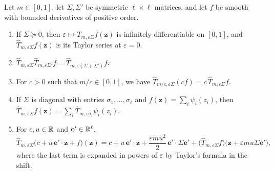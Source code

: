 \begin{lemma}\label{lem:cub-formal}
Let $m\in[0,1]$, let $\Sigma,\Sigma'$ be symmetric $\ell\times\ell$ matrices, and
let $f$ be smooth with bounded derivatives of positive order.
\begin{enumerate}[label=\textup{(\alph*)}]
\item If $\Sigma\succeq0$, then $\varepsilon\mapsto T_{m,\varepsilon\Sigma}f(\mathbf z)$
 is infinitely differentiable on $[0,1]$, and $\widehat T_{m,\varepsilon\Sigma}f(\mathbf z)$ is its
 Taylor series at $\varepsilon=0$.
\item $\widehat T_{m,\varepsilon\Sigma}\widehat T_{m,\varepsilon\Sigma'}f
 =\widehat T_{m,\varepsilon(\Sigma+\Sigma')}f$.
\item For $c>0$ such that $m/c\in[0,1]$, we have $\widehat T_{m/c,\varepsilon\Sigma}(cf)=c\,\widehat
 T_{m,\varepsilon\Sigma}f$.
\item If $\Sigma$ is diagonal with entries $\sigma_1,\dots,\sigma_\ell$ and
 $f(\mathbf z)=\sum_i\psi_i(z_i)$, then $\widehat T_{m,\varepsilon\Sigma}f(\mathbf
 z)=\sum_i\widehat T_{m,\varepsilon\sigma_i}\psi_i(z_i)$.
\item For $c,u\in\mathbb R$ and $\mathbf e'\in\mathbb R^\ell$,
 \[
  \widehat T_{m,\varepsilon\Sigma}\bigl(c+u\,\mathbf e'\cdot\mathbf z+f\bigr)(\mathbf z)
  =c+u\,\mathbf e'\cdot\mathbf z+\frac{\varepsilon mu^2}2\,\mathbf e'\cdot\Sigma\mathbf e'
  +\bigl(\widehat T_{m,\varepsilon\Sigma}f\bigr)\bigl(\mathbf z+\varepsilon mu\Sigma\mathbf e'\bigr),
 \]
 where the last term is expanded in powers of $\varepsilon$ by Taylor's formula
 in the shift.
\end{enumerate}
\end{lemma}

